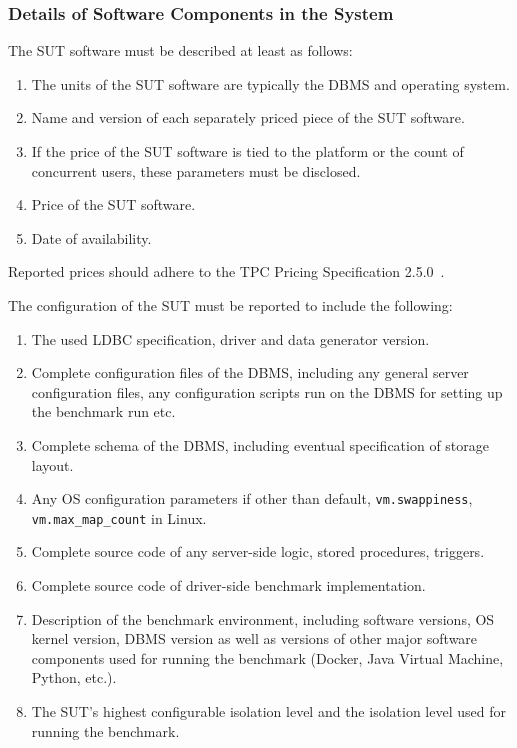 \subsubsection{Details of Software Components in the System}
The SUT software must be described at least as follows:
\begin{enumerate}
    \item The units of the SUT software are typically the DBMS and operating system.
    \item Name and version of each separately priced piece of the SUT software.
    \item If the price of the SUT software is tied to the platform or the count of concurrent users, these parameters must be disclosed.
    \item Price of the SUT software.
    \item Date of availability.
\end{enumerate}
Reported prices should adhere to the TPC Pricing Specification 2.5.0~\cite{pricing,tpc-pricing}.

The configuration of the SUT must be reported to include the following:
\begin{enumerate}
    \item The used LDBC specification, driver and data generator version.
    \item Complete configuration files of the DBMS, including any general server configuration files, any configuration scripts run on the DBMS for setting up the benchmark run etc.
    \item Complete schema of the DBMS, including eventual specification of storage layout.
    \item Any OS configuration parameters if other than default, \eg \verb+vm.swappiness+, \verb+vm.max_map_count+ in Linux.
    \item Complete source code of any server-side logic, \eg stored procedures, triggers.
    \item Complete source code of driver-side benchmark implementation.
    \item Description of the benchmark environment, including software versions, OS kernel version, DBMS version as well as versions of other major software components used for running the benchmark (Docker, Java Virtual Machine, Python, etc.).
    \item The SUT's highest configurable isolation level and the isolation level used for running the benchmark.
\end{enumerate}


